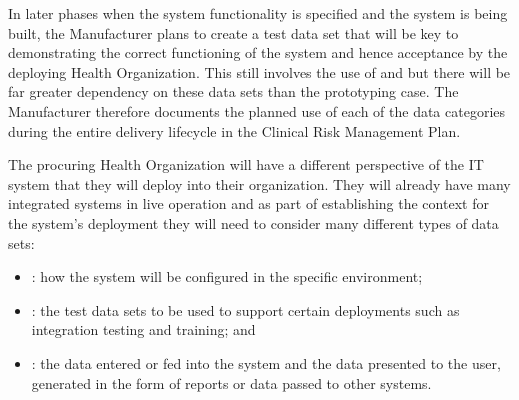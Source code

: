 In later phases when the system functionality is specified and the system is being built, the Manufacturer plans to create a test data set that will be key to demonstrating the correct functioning of the system and hence acceptance by the deploying Health Organization. This still involves the use of  and  but there will be far greater dependency on these data sets than the prototyping case. The Manufacturer therefore documents the planned use of each of the data categories during the entire delivery lifecycle in the Clinical Risk Management Plan.

\begin{minipage}[t]{0.73\textwidth}
	The procuring Health Organization will have a different perspective of the IT system that they will deploy into their organization. They will already have many integrated systems in live operation and as part of establishing the context for the system's deployment they will need to consider many different types of data sets:
\end{minipage}
\begin{minipage}[t]{0.25\textwidth}
  \centering{}
\end{minipage}
	\begin{itemize}
		\item {}: how the system will be configured in the specific environment;
		\item {}: the test data sets to be used to support certain deployments such as integration testing and training; and
		\item {}: the data entered or fed into the system and the data presented to the user, generated in the form of reports or data passed to other systems.
	\end{itemize}

